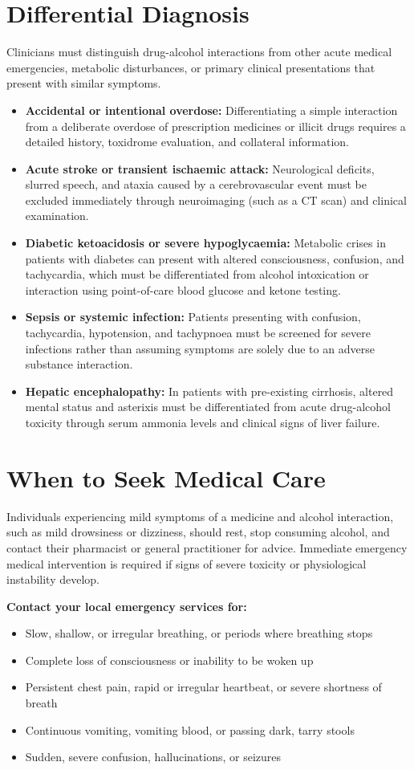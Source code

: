 \section*{Differential Diagnosis}
Clinicians must distinguish drug-alcohol interactions from other acute medical emergencies, metabolic disturbances, or primary clinical presentations that present with similar symptoms.
\begin{itemize}
    \item \textbf{Accidental or intentional overdose:} Differentiating a simple interaction from a deliberate overdose of prescription medicines or illicit drugs requires a detailed history, toxidrome evaluation, and collateral information.
    \item \textbf{Acute stroke or transient ischaemic attack:} Neurological deficits, slurred speech, and ataxia caused by a cerebrovascular event must be excluded immediately through neuroimaging (such as a CT scan) and clinical examination.
    \item \textbf{Diabetic ketoacidosis or severe hypoglycaemia:} Metabolic crises in patients with diabetes can present with altered consciousness, confusion, and tachycardia, which must be differentiated from alcohol intoxication or interaction using point-of-care blood glucose and ketone testing.
    \item \textbf{Sepsis or systemic infection:} Patients presenting with confusion, tachycardia, hypotension, and tachypnoea must be screened for severe infections rather than assuming symptoms are solely due to an adverse substance interaction.
    \item \textbf{Hepatic encephalopathy:} In patients with pre-existing cirrhosis, altered mental status and asterixis must be differentiated from acute drug-alcohol toxicity through serum ammonia levels and clinical signs of liver failure.
\end{itemize}

\section*{When to Seek Medical Care}
Individuals experiencing mild symptoms of a medicine and alcohol interaction, such as mild drowsiness or dizziness, should rest, stop consuming alcohol, and contact their pharmacist or general practitioner for advice. Immediate emergency medical intervention is required if signs of severe toxicity or physiological instability develop.

\textbf{Contact your local emergency services for:}
\begin{itemize}
    \item Slow, shallow, or irregular breathing, or periods where breathing stops
    \item Complete loss of consciousness or inability to be woken up
    \item Persistent chest pain, rapid or irregular heartbeat, or severe shortness of breath
    \item Continuous vomiting, vomiting blood, or passing dark, tarry stools
    \item Sudden, severe confusion, hallucinations, or seizures
\end{itemize}

